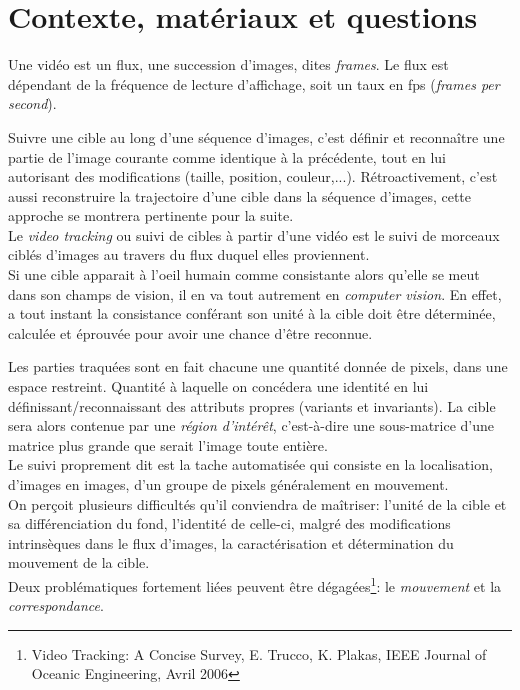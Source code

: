 \documentclass[a4paper,12pt]{report}
\begin{document}
\section{Contexte, matériaux et questions}
Une vidéo est un flux, une succession d'images, dites  \textit{frames}. Le flux est dépendant de la fréquence de lecture \/ d'affichage, soit un taux en fps (\textit{frames per second}). 

Suivre une cible au long d'une séquence d'images, c'est définir et reconnaître une partie de l'image courante comme identique à la précédente, tout en lui autorisant des modifications (taille, position, couleur,...). Rétroactivement, c'est aussi reconstruire la trajectoire d'une cible dans la séquence d'images, cette approche se montrera pertinente pour la suite.\\

Le \textit{video tracking} ou suivi de cibles à partir d'une vidéo est le suivi de morceaux ciblés d'images au travers du flux duquel elles proviennent. \\
Si une cible apparait à l'oeil humain comme consistante alors qu'elle se meut dans son champs de vision, il en va tout autrement en \textit{computer vision}. En effet, a tout instant la consistance conférant son unité à la cible doit être déterminée, calculée et éprouvée pour avoir une chance d'être reconnue. 

Les parties traquées sont en fait chacune une quantité donnée de pixels, dans une espace restreint. Quantité à laquelle on concédera une identité en lui définissant/reconnaissant des attributs propres (variants et invariants). La cible sera alors contenue par une \textit{région d'intérêt}, c'est-à-dire une sous-matrice d'une matrice plus grande que serait l'image toute entière.\\
Le suivi proprement dit est la tache automatisée qui consiste en la localisation, d'images en images, d'un groupe de pixels généralement en mouvement.\\

On perçoit plusieurs difficultés qu'il conviendra de maîtriser: l'unité de la cible et sa différenciation du fond, l'identité de celle-ci, malgré des modifications intrinsèques dans le flux d'images, la caractérisation et détermination du mouvement de la cible.\\
Deux problématiques fortement liées peuvent être dégagées\footnote{Video Tracking: A Concise Survey, E. Trucco, K. Plakas, IEEE Journal of Oceanic Engineering, Avril 2006}: le \textit{mouvement} et la \textit{correspondance}.
\end{document}
